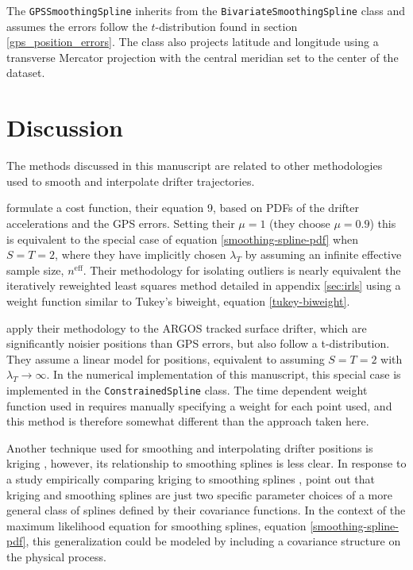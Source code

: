 \documentclass{ametsoc}
\begin{document}
The \texttt{GPSSmoothingSpline} inherits from the \texttt{BivariateSmoothingSpline} class and assumes the errors follow the $t$-distribution found in section \ref{gps_position_errors}. The class also projects latitude and longitude using a transverse Mercator projection with the central meridian set to the center of the dataset.

\section{Discussion}

The methods discussed in this manuscript are related to other methodologies used to smooth and interpolate drifter trajectories.

\citet{yaremchuk2015-joe} formulate a cost function, their equation 9, based on PDFs of the drifter accelerations and the GPS errors. Setting their $\mu=1$ (they choose $\mu=0.9$) this is equivalent to the special case of equation \ref{smoothing-spline-pdf} when $S=T=2$, where they have implicitly chosen $\lambda_T$ by assuming an infinite effective sample size, $n^\textrm{eff}$. Their methodology for isolating outliers is nearly equivalent the iteratively reweighted least squares method detailed in appendix \ref{sec:irls} using a weight function similar to Tukey's biweight, equation \ref{tukey-biweight}.

\citet{elipot2016-jgr} apply their methodology to the ARGOS tracked surface drifter, which are significantly noisier positions than GPS errors, but also follow a t-distribution. They assume a linear model for positions, equivalent to assuming $S=T=2$ with $\lambda_T \rightarrow \infty$. In the numerical implementation of this manuscript, this special case is implemented in the \texttt{ConstrainedSpline} class. The time dependent weight function used in \citet{elipot2016-jgr} requires manually specifying a weight for each point used, and this method is therefore somewhat different than the approach taken here.

Another technique used for smoothing and interpolating drifter positions is kriging \citep{hansen1996-jtech}, however, its relationship to smoothing splines is less clear. In response to a study empirically comparing kriging to smoothing splines \citep{laslett1994-jasa},  \citet{handcock1994-jasa} point out that kriging and smoothing splines are just two specific parameter choices of a more general class of splines defined by their covariance functions. In the context of the maximum likelihood equation for smoothing splines, equation \ref{smoothing-spline-pdf}, this generalization could be modeled by including a covariance structure on the physical process. 
\end{document}
